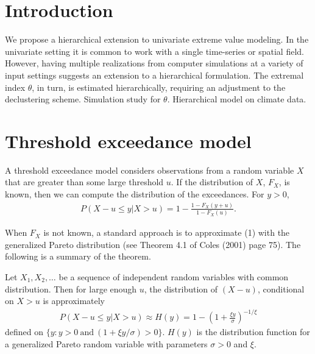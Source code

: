 \documentclass[12pt]{article}
\begin{document}
\section{Introduction}

We propose a hierarchical extension to univariate extreme value modeling. In the univariate setting it is common to work with a single time-series or spatial field. However, having multiple realizations from computer simulations at a variety of input settings suggests an extension to a hierarchical formulation. The extremal index $\theta$, in turn, is estimated hierarchically, requiring an adjustment to the declustering scheme. Simulation study for $\theta$. Hierarchical model on climate data.

\section{Threshold exceedance model}

A threshold exceedance model considers observations from a random variable $X$ that are greater than some large threshold $u$. If the distribution of $X$, $F_X$, is known, then we can compute the distribution of the exceedances. For $y>0$,
\begin{align}
P(X-u\leq y| X > u) = 1-\frac{1-F_X(y+u)}{1-F_X(u)}.
\end{align}

When $F_X$ is not known, a standard approach is to approximate (1) with the generalized Pareto distribution (see Theorem 4.1 of Coles (2001) page 75). The following is a summary of the theorem.
\bigskip

Let $X_1,X_2,\ldots$ be a sequence of independent random variables with common distribution. Then for large enough $u$, the distribution of $(X-u)$, conditional on $X>u$ is approximately
\begin{align}
P(X-u\leq y|X>u) \approx H(y) = 1 - \left(1+\frac{\xi y}{\sigma}\right)^{-1/\xi} \label{gpapprox}
\end{align}
defined on $\{y:y>0~\mathrm{and}~(1+\xi y/\sigma) >0\}$. $H(y)$ is the distribution function for a generalized Pareto random variable with parameters $\sigma>0$ and $\xi$.
\bigskip
\end{document}
